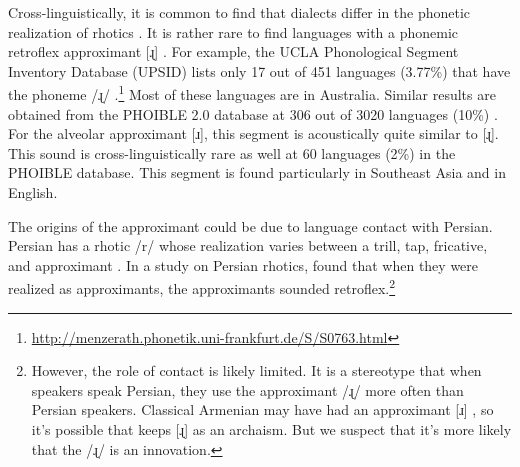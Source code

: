 Cross-linguistically, it is common to find that dialects differ in the phonetic realization of rhotics \citep{LadefogedMaddieson-1996-soundsWordldsLanguage,chabot-2019-WhatsWrongRhotic}.  It is rather rare to find languages with a phonemic retroflex approximant [ɻ] \citep[28]{Arsenault-2017-RetroflexionSouthAsiaTypologicalGeneticArealPatterns}. For example,  the UCLA Phonological Segment Inventory Database (UPSID) lists only 17 out of 451 languages (3.77\%) that have the phoneme /ɻ/  \citep{MaddiesonPrecoda-1989-UpdatingUPSID}.\footnote{\url{http://menzerath.phonetik.uni-frankfurt.de/S/S0763.html}} Most of these languages are in Australia. Similar results are obtained from the PHOIBLE 2.0 database at  306 out of 3020 languages (10\%) \citep{phoible}.  For the alveolar approximant [ɹ], this segment is acoustically quite similar to [ɻ]. This sound is cross-linguistically rare as well at 60 languages (2\%) in the PHOIBLE database. This segment is found particularly in Southeast Asia and in English. 



The origins of the {\iaIA} approximant could be due to language contact with Persian. Persian has a rhotic /{r}/ whose realization varies between a trill, tap, fricative, and approximant \citep{majidi-1991-persianFarsiJIPA,rafat-2010-socioPhoneticInvestigtionRhoticPersian}.  In a study on  Persian rhotics, \citet[675]{rafat-2010-socioPhoneticInvestigtionRhoticPersian} found that when  they were realized as   approximants, the approximants sounded retroflex.\footnote{However, the role of contact is likely limited. It is a stereotype that when {\iaAbbre} speakers speak Persian, they use the approximant /ɻ/ more often than Persian speakers. Classical Armenian may have had an approximant [ɹ] \citep[1040]{Macak-2017-PhonoClassicalArmenian}, so it's possible that {\iaAbbre} keeps [ɻ] as an archaism. But we suspect that it's more likely that the {\iaAbbre} /ɻ/ is an innovation.}

